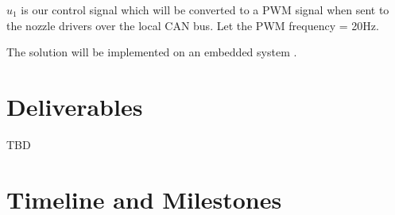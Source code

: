 


$u_1$ is our control signal which will be converted to a PWM signal when sent to the nozzle drivers over the local CAN bus. Let the PWM frequency = 20Hz.



The solution will be implemented on an embedded system .

\section{Deliverables}
\label{sec:deliverables}

TBD

\section{Timeline and Milestones}
\label{sec:timeline}



